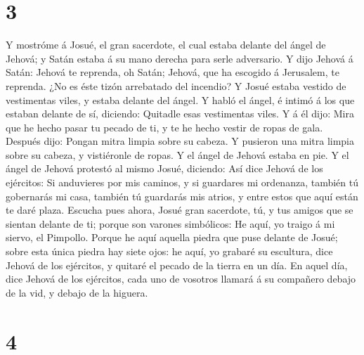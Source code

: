 \hypertarget{section-2}{%
\section{3}\label{section-2}}

 Y mostróme á Josué, el gran sacerdote, el cual estaba
delante del ángel de Jehová; y Satán estaba á su mano derecha para serle
adversario.  Y dijo Jehová á Satán: Jehová te reprenda, oh
Satán; Jehová, que ha escogido á Jerusalem, te reprenda. ¿No es éste
tizón arrebatado del incendio?  Y Josué estaba vestido de
vestimentas viles, y estaba delante del ángel.  Y habló el
ángel, é intimó á los que estaban delante de sí, diciendo: Quitadle esas
vestimentas viles. Y á él dijo: Mira que he hecho pasar tu pecado de ti,
y te he hecho vestir de ropas de gala.  Después dijo:
Pongan mitra limpia sobre su cabeza. Y pusieron una mitra limpia sobre
su cabeza, y vistiéronle de ropas. Y el ángel de Jehová estaba en pie.
 Y el ángel de Jehová protestó al mismo Josué, diciendo:
 Así dice Jehová de los ejércitos: Si anduvieres por mis
caminos, y si guardares mi ordenanza, también tú gobernarás mi casa,
también tú guardarás mis atrios, y entre estos que aquí están te daré
plaza.  Escucha pues ahora, Josué gran sacerdote, tú, y
tus amigos que se sientan delante de ti; porque son varones simbólicos:
He aquí, yo traigo á mi siervo, el Pimpollo.  Porque he
aquí aquella piedra que puse delante de Josué; sobre esta única piedra
hay siete ojos: he aquí, yo grabaré su escultura, dice Jehová de los
ejércitos, y quitaré el pecado de la tierra en un día. 
En aquel día, dice Jehová de los ejércitos, cada uno de vosotros llamará
á su compañero debajo de la vid, y debajo de la higuera.

\hypertarget{section-3}{%
\section{4}\label{section-3}}

